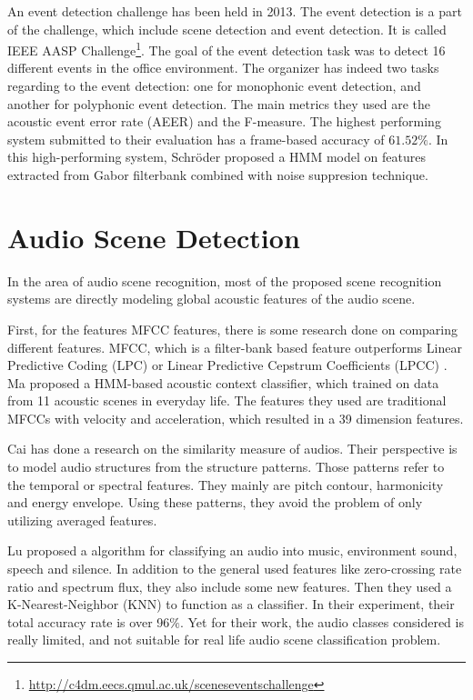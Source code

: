 An event detection challenge has been held in 2013. 
The event detection is a part of the challenge, which include scene detection and event detection.  
It is called IEEE AASP Challenge\footnote{\url{http://c4dm.eecs.qmul.ac.uk/sceneseventschallenge}}. 
The goal of the event detection task was to detect 16 different events in the office environment. 
The organizer has indeed two tasks regarding to the event detection: one for monophonic event detection, and another for polyphonic event detection.  
The main metrics they used are the acoustic event error rate (AEER) \cite{giannoulis2013ieee} and the F-measure.
The highest performing system submitted to their evaluation has a frame-based accuracy of $61.52\%$. 
In this high-performing system, Schr\"{o}der \et \cite{schroder2013acoustic} proposed a HMM model on features extracted from Gabor filterbank combined with noise suppresion technique. 

\section{Audio Scene Detection}
In the area of audio scene recognition, most of the proposed scene recognition systems are directly modeling global acoustic features of the audio scene. 

First, for the features MFCC features, there is some research done on comparing different features. 
MFCC, which is a filter-bank based feature outperforms Linear Predictive Coding (LPC) or Linear Predictive Cepstrum Coefficients (LPCC) \cite{levy2003comparison}. 
Ma \et \cite{ma2006acoustic} proposed a HMM-based acoustic context classifier, which trained on data from 11 acoustic scenes in everyday life. 
The features they used are traditional MFCCs with velocity and acceleration, which resulted in a 39 dimension features. 

Cai \et \cite{cai03usingstructure} has done a research on the similarity measure of audios. 
Their perspective is to model audio structures from the structure patterns. 
Those patterns refer to the temporal or spectral features. 
They mainly are pitch contour, harmonicity and energy envelope. 
Using these patterns, they avoid the problem of only utilizing averaged features. 

Lu \et \cite{lu2001robust} proposed a algorithm for classifying an audio into music, environment sound, speech and silence. 
In addition to the general used features like zero-crossing rate ratio and spectrum flux, they also include some new features. 
Then they used a K-Nearest-Neighbor (KNN) to function as a classifier. 
In their experiment, their total accuracy rate is over 96$\%$. 
Yet for their work, the audio classes considered is really limited, and not suitable for real life audio scene classification problem.  

